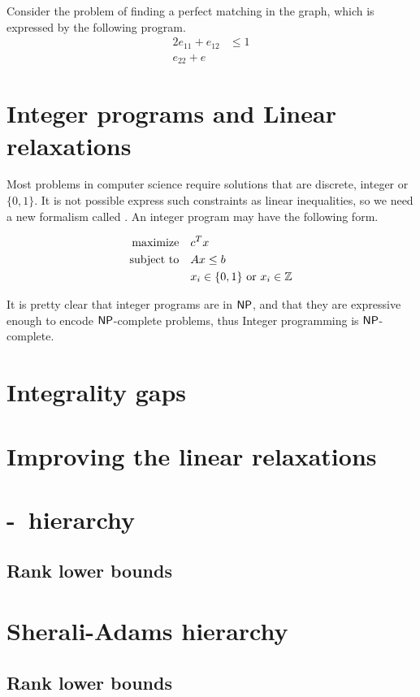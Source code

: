 \documentclass[a4paper,twoside,justified]{tufte-handout}
\begin{document}
\begin{marginfigure}
\begin{example}
  Consider the problem of finding a perfect matching in the graph,
  which is expressed by the following program.
  \begin{alignat*}{2}
    e_{11} + e_{12} & \leq 1\\
    e_{22} + e_{}
  \end{alignat*}
\end{example}
\end{marginfigure}

\section{Integer programs and Linear relaxations}

Most problems in computer science require solutions that are discrete,
integer or $ \{0,1\} $. It is not possible express such constraints as
linear inequalities, so we need a new formalism called
. An integer program may have the
following form.

\begin{alignat*}{2}
  \text{maximize}\hspace{1em}&  c^{T}x\\
  \text{subject to}\hspace{1em}& Ax \leq b\\
  & x_{i} \in\{0,1\} \text{\ or\ } x_{i} \in \mathbb{Z}
\end{alignat*}

It is pretty clear that integer programs are in $ \mathsf{NP} $, and that they
are expressive enough to encode $\mathsf{NP}$-complete problems, thus Integer
programming is $\mathsf{NP}$-complete.

\section{Integrality gaps}


\section{Improving the linear relaxations}


\section{\Lovasz-\Schrijver\ hierarchy}

\subsection{Rank lower bounds}

\section{Sherali-Adams hierarchy}

\subsection{Rank lower bounds}




\end{document}

